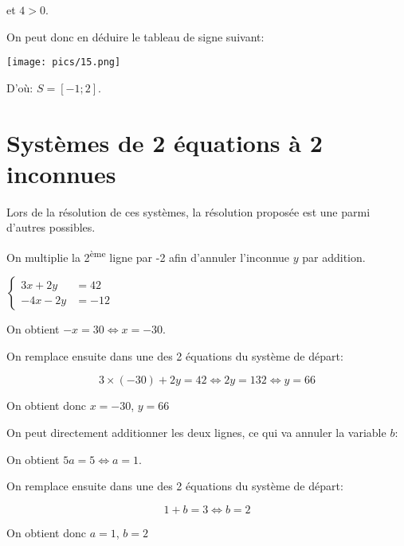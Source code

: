\documentclass[a4paper,12pt]{scrartcl}
\begin{document}
et $4 > 0$.

On peut donc en déduire le tableau de signe suivant: 

\texttt{[image: pics/15.png]}



D'où: $S = [-1;2]$.


\section*{Systèmes de 2 équations à 2 inconnues}


Lors de la résolution de ces systèmes, la résolution proposée est une parmi d'autres possibles. 


On multiplie la 2\textsuperscript{ème} ligne par -2 afin d'annuler l'inconnue $y$ par addition.

$
\begin{cases}
3x+2y &= 42\\ 
-4x-2y &= -12
\end{cases}$

On obtient $-x = 30 \Leftrightarrow x = -30$.

On remplace ensuite dans une des 2 équations du système de départ:

$$3 \times (-30) +2y = 42 \Leftrightarrow 2y = 132 \Leftrightarrow y = 66$$

On obtient donc $x=-30$, $y=66$


On peut directement additionner les deux lignes, ce qui va annuler la variable $b$:

On obtient $5a = 5 \Leftrightarrow a = 1$.

On remplace ensuite dans une des 2 équations du système de départ:

$$1+b = 3 \Leftrightarrow b = 2$$

On obtient donc $a=1$, $b=2$

\end{document}
